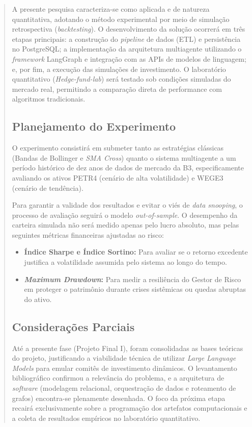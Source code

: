 \documentclass{eic-bcc-tcc}
\begin{document}
\begin{abstract}
\begin{itemize}
A presente pesquisa caracteriza-se como aplicada e de natureza quantitativa, adotando o método experimental por meio de simulação retrospectiva (\textit{backtesting}). O desenvolvimento da solução ocorrerá em três etapas principais: a construção do \textit{pipeline} de dados (ETL) e persistência no PostgreSQL; a implementação da arquitetura multiagente utilizando o \textit{framework} LangGraph e integração com as APIs de modelos de linguagem; e, por fim, a execução das simulações de investimento. O laboratório quantitativo (\textit{Hedge-fund-lab}) será testado sob condições simuladas do mercado real, permitindo a comparação direta de performance com algoritmos tradicionais.

\subsection{Planejamento do Experimento}

O experimento consistirá em submeter tanto as estratégias clássicas (Bandas de Bollinger e \textit{SMA Cross}) quanto o sistema multiagente a um período histórico de dez anos de dados de mercado da B3, especificamente avaliando os ativos PETR4 (cenário de alta volatilidade) e WEGE3 (cenário de tendência).

Para garantir a validade dos resultados e evitar o viés de \textit{data snooping}, o processo de avaliação seguirá o modelo \textit{out-of-sample}. O desempenho da carteira simulada não será medido apenas pelo lucro absoluto, mas pelas seguintes métricas financeiras ajustadas ao risco:
\begin{itemize}
    \item \textbf{Índice Sharpe e Índice Sortino:} Para avaliar se o retorno excedente justifica a volatilidade assumida pelo sistema ao longo do tempo.
    \item \textbf{\textit{Maximum Drawdown}:} Para medir a resiliência do Gestor de Risco em proteger o patrimônio durante crises sistêmicas ou quedas abruptas do ativo.
\end{itemize}

\subsection{Considerações Parciais}

Até a presente fase (Projeto Final I), foram consolidadas as bases teóricas do projeto, justificando a viabilidade técnica de utilizar \textit{Large Language Models} para emular comitês de investimento dinâmicos. O levantamento bibliográfico confirmou a relevância do problema, e a arquitetura de \textit{software} (modelagem relacional, orquestração de dados e roteamento de grafos) encontra-se plenamente desenhada. O foco da próxima etapa recairá exclusivamente sobre a programação dos artefatos computacionais e a coleta de resultados empíricos no laboratório quantitativo.


\end{itemize}
\end{abstract}
\end{document}
